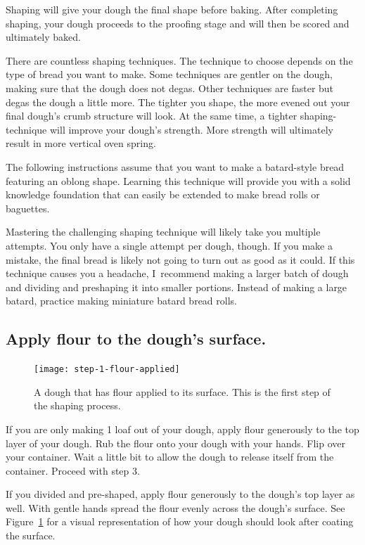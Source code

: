 Shaping will give your dough the final shape before baking. After
completing shaping, your dough proceeds to the proofing stage and
will then be scored and ultimately baked.

There are countless shaping techniques. The technique to choose
depends on the type of bread you want to make. Some techniques
are gentler on the dough, making sure that the dough does not
degas. Other techniques are faster but degas the dough a little
more. The tighter you shape, the more evened out your final dough's
crumb structure will look. At the same time, a tighter shaping-technique
will improve your dough's strength. More strength will ultimately result
in more vertical oven spring.

The following instructions assume that you want to make a batard-style
bread featuring an oblong shape. Learning this technique
will provide you with a solid knowledge foundation that
can easily be extended to make bread rolls or baguettes.

Mastering the challenging shaping technique will likely take you
multiple attempts. You only have a single attempt per dough, though. If you
make a mistake, the final bread is likely not going to turn out as good
as it could. If this technique causes you a headache, I~recommend making
a larger batch of dough and dividing and preshaping it into
smaller portions. Instead of making a large batard, practice making miniature
batard bread rolls.

\subsection[Flouring the surface]{Apply flour to the dough's surface.}

\begin{figure}[!htb]
  \texttt{[image: step-1-flour-applied]}
  \caption[Step 1 of shaping process]{A dough that has flour applied to its
      surface. This is the first step of the shaping process.}%
  \label{fig:shaping-flour-surface}
\end{figure}

If you are only making 1 loaf out of your dough, apply flour
generously to the top layer of your dough. Rub the flour onto your
dough with your hands. Flip over your container. Wait a little bit
to allow the dough to release itself from the container. Proceed
with step 3.

If you divided and pre-shaped, apply flour generously to the dough's
top layer as well. With gentle hands spread the flour evenly across
the dough's surface. See Figure~\ref{fig:shaping-flour-surface} for a
visual representation of how your dough should look after coating
the surface.

